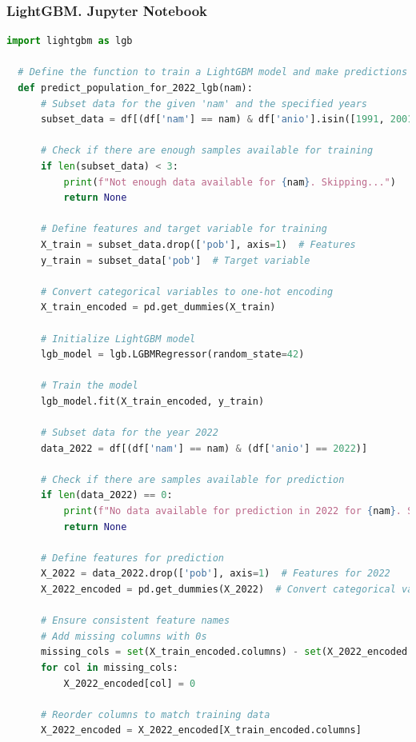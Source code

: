 \documentclass{article}
\theoremstyle{mytheoremstyle}
\theoremstyle{mytheoremstyle}
\theoremstyle{myproblemstyle}
\begin{document}
\subsubsection{LightGBM. Jupyter Notebook}
\begin{lstlisting}[language=Python, caption=LightGMB.ipynb,label={lst:LightGBM.ipynb}]
  import lightgbm as lgb

  # Define the function to train a LightGBM model and make predictions for 2022
  def predict_population_for_2022_lgb(nam):
      # Subset data for the given 'nam' and the specified years
      subset_data = df[(df['nam'] == nam) & df['anio'].isin([1991, 2001, 2010])]
      
      # Check if there are enough samples available for training
      if len(subset_data) < 3:
          print(f"Not enough data available for {nam}. Skipping...")
          return None
      
      # Define features and target variable for training
      X_train = subset_data.drop(['pob'], axis=1)  # Features
      y_train = subset_data['pob']  # Target variable
      
      # Convert categorical variables to one-hot encoding
      X_train_encoded = pd.get_dummies(X_train)
      
      # Initialize LightGBM model
      lgb_model = lgb.LGBMRegressor(random_state=42)
      
      # Train the model
      lgb_model.fit(X_train_encoded, y_train)
      
      # Subset data for the year 2022
      data_2022 = df[(df['nam'] == nam) & (df['anio'] == 2022)]
      
      # Check if there are samples available for prediction
      if len(data_2022) == 0:
          print(f"No data available for prediction in 2022 for {nam}. Skipping...")
          return None
      
      # Define features for prediction
      X_2022 = data_2022.drop(['pob'], axis=1)  # Features for 2022
      X_2022_encoded = pd.get_dummies(X_2022)  # Convert categorical variables
      
      # Ensure consistent feature names
      # Add missing columns with 0s
      missing_cols = set(X_train_encoded.columns) - set(X_2022_encoded.columns)
      for col in missing_cols:
          X_2022_encoded[col] = 0
      
      # Reorder columns to match training data
      X_2022_encoded = X_2022_encoded[X_train_encoded.columns]
      

\end{lstlisting}
\end{document}
